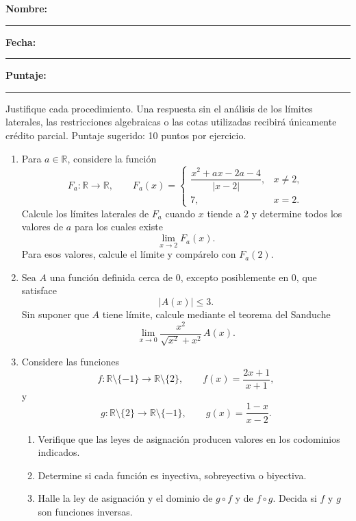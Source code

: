 \documentclass[10pt,a5paper]{article}
\begin{document}

\noindent
\textbf{Nombre:} \rule{7cm}{0.4pt}

\medskip
\noindent
\textbf{Fecha:} \rule{3cm}{0.4pt}
\hfill
\textbf{Puntaje:} \rule{1.5cm}{0.4pt}

\begin{nota}[indicaciones]
Justifique cada procedimiento. Una respuesta sin el análisis de los límites
laterales, las restricciones algebraicas o las cotas utilizadas recibirá
únicamente crédito parcial. Puntaje sugerido: 10 puntos por ejercicio.
\end{nota}

\begin{ejercicios}
\begin{enumerate}
  \item Para $a\in\mathbb{R}$, considere la función
  \[
    F_a\colon\mathbb{R}\to\mathbb{R},
    \qquad
    F_a(x)=
    \begin{cases}
      \dfrac{x^2+ax-2a-4}{|x-2|}, & x\neq2,\\[2mm]
      7, & x=2.
    \end{cases}
  \]
  Calcule los límites laterales de $F_a$ cuando $x$ tiende a $2$ y determine
  todos los valores de $a$ para los cuales existe
  \[
    \lim_{x\to2}F_a(x).
  \]
  Para esos valores, calcule el límite y compárelo con $F_a(2)$.

  \item Sea $A$ una función definida cerca de $0$, excepto posiblemente en
  $0$, que satisface
  \[
    |A(x)|\leq3.
  \]
  Sin suponer que $A$ tiene límite, calcule mediante el teorema del Sanduche
  \[
    \lim_{x\to0}
    \frac{x^2}{\sqrt{x^2}+x^2}\,A(x).
  \]

  \item Considere las funciones
  \[
    f\colon\mathbb{R}\setminus\{-1\}
    \to\mathbb{R}\setminus\{2\},
    \qquad
    f(x)=\frac{2x+1}{x+1},
  \]
  y
  \[
    g\colon\mathbb{R}\setminus\{2\}
    \to\mathbb{R}\setminus\{-1\},
    \qquad
    g(x)=\frac{1-x}{x-2}.
  \]
  \begin{enumerate}
    \item Verifique que las leyes de asignación producen valores en los
    codominios indicados.
    \item Determine si cada función es inyectiva, sobreyectiva o biyectiva.
    \item Halle la ley de asignación y el dominio de $g\circ f$ y de
    $f\circ g$. Decida si $f$ y $g$ son funciones inversas.
  \end{enumerate}
\end{enumerate}
\end{ejercicios}
\end{document}
